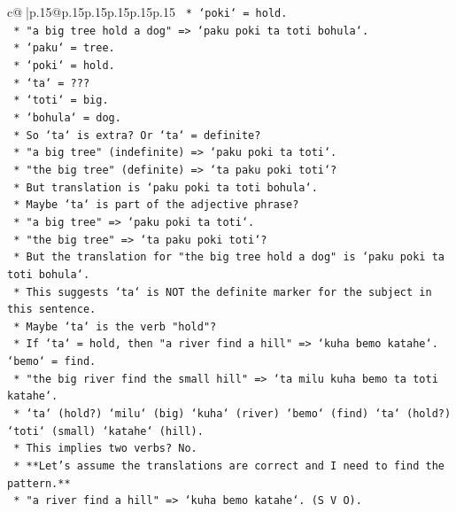 \documentclass{article}
\begin{document}
{\begin{supertabular}{c@{$\;$}|p{.15\linewidth}@{}p{.15\linewidth}p{.15\linewidth}p{.15\linewidth}p{.15\linewidth}p{.15\linewidth}}
{{{\texttt{            *   `poki` = hold.} \\
\texttt{        *   "a big tree hold a dog" => `paku poki ta toti bohula`.} \\
\texttt{            *   `paku` = tree.} \\
\texttt{            *   `poki` = hold.} \\
\texttt{            *   `ta` = ???} \\
\texttt{            *   `toti` = big.} \\
\texttt{            *   `bohula` = dog.} \\
\texttt{            *   So `ta` is extra? Or `ta` = definite?} \\
\texttt{            *   "a big tree" (indefinite) => `paku poki ta toti`.} \\
\texttt{            *   "the big tree" (definite) => `ta paku poki toti`?} \\
\texttt{            *   But translation is `paku poki ta toti bohula`.} \\
\texttt{            *   Maybe `ta` is part of the adjective phrase?} \\
\texttt{            *   "a big tree" => `paku poki ta toti`.} \\
\texttt{            *   "the big tree" => `ta paku poki toti`?} \\
\texttt{            *   But the translation for "the big tree hold a dog" is `paku poki ta toti bohula`.} \\
\texttt{            *   This suggests `ta` is NOT the definite marker for the subject in this sentence.} \\
\texttt{            *   Maybe `ta` is the verb "hold"?} \\
\texttt{            *   If `ta` = hold, then "a river find a hill" => `kuha bemo katahe`. `bemo` = find.} \\
\texttt{            *   "the big river find the small hill" => `ta milu kuha bemo ta toti katahe`.} \\
\texttt{                *   `ta` (hold?) `milu` (big) `kuha` (river) `bemo` (find) `ta` (hold?) `toti` (small) `katahe` (hill).} \\
\texttt{                *   This implies two verbs? No.} \\
\texttt{    *   **Let's assume the translations are correct and I need to find the pattern.**} \\
\texttt{        *   "a river find a hill" => `kuha bemo katahe`. (S V O).} \\
}}}
\end{supertabular}}
\end{document}
